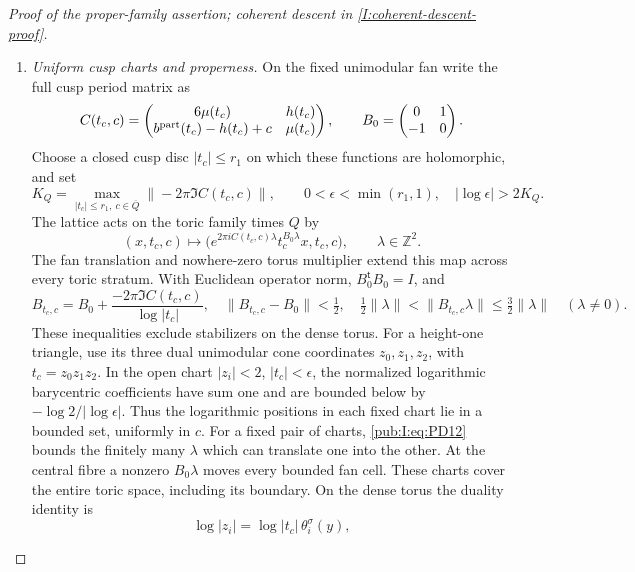 \begin{proof}[Proof of the proper-family assertion; coherent descent in \cref{I:coherent-descent-proof}]
\begin{enumerate}[label=\arabic*.,leftmargin=*]
\item \emph{Uniform cusp charts and properness.}
On the fixed unimodular fan write the full cusp period matrix as
\begin{equation}
 C(t_c,c)=\begin{pmatrix}6\mu(t_c)&h(t_c)\\
 b^{\rm part}(t_c)-h(t_c)+c&\mu(t_c)\end{pmatrix},
 \qquad B_0=\begin{pmatrix}0&1\\-1&0\end{pmatrix}.
\label{pub:I:eq:PD9}
\end{equation}
Choose a closed cusp disc $|t_c|\le r_1$ on which these functions
are holomorphic, and set
\begin{equation}
 K_Q=\max_{|t_c|\le r_1,\ c\in\overline Q}
               \|-2\pi\Im C(t_c,c)\|,
 \qquad 0<\epsilon<\min(r_1,1),\quad
               |\log\epsilon|>2K_Q.
\label{pub:I:eq:PD10}
\end{equation}
The lattice acts on the toric family times $Q$ by
\begin{equation}
 (x,t_c,c)\longmapsto
 \bigl(e^{2\pi iC(t_c,c)\lambda}t_c^{B_0\lambda}x,t_c,c\bigr),
 \qquad\lambda\in\mathbb Z^2.
\label{pub:I:eq:PD11}
\end{equation}
The fan translation and nowhere-zero torus multiplier extend this
map across every toric stratum. With Euclidean operator norm,
$B_0^{\mathsf t}B_0=I$, and
\begin{equation}
 B_{t_c,c}=B_0+\frac{-2\pi\Im C(t_c,c)}{\log|t_c|},
 \quad \|B_{t_c,c}-B_0\|<\tfrac12,
 \quad \tfrac12\|\lambda\|<\|B_{t_c,c}\lambda\|
                    \le\tfrac32\|\lambda\|\quad(\lambda\ne0).
\label{pub:I:eq:PD12}
\end{equation}
These inequalities exclude stabilizers on the dense torus.
For a height-one triangle, use its three dual unimodular cone
coordinates $z_0,z_1,z_2$, with $t_c=z_0z_1z_2$.
In the open chart $|z_i|<2$, $|t_c|<\epsilon$, the normalized
logarithmic barycentric coefficients have sum one and are bounded
below by $-\log2/|\log\epsilon|$. Thus the logarithmic positions
in each fixed chart lie in a bounded set, uniformly in $c$.
For a fixed pair of charts, \eqref{pub:I:eq:PD12} bounds the finitely many
$\lambda$ which can translate one into the other. At the central
fibre a nonzero $B_0\lambda$ moves every bounded fan cell.
These charts cover the entire toric space, including its boundary.
On the dense torus the duality identity is
\[
 \log|z_i|=\log|t_c|\,\theta_i^\sigma(y),
\]
\end{enumerate}
\end{proof}
